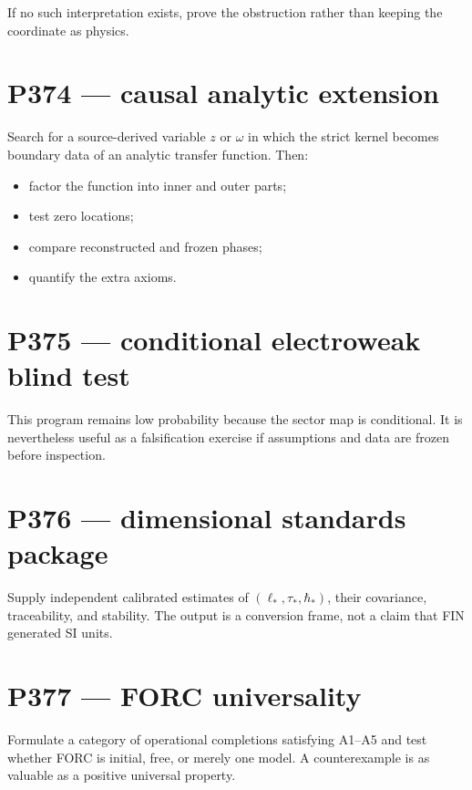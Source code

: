 \documentclass[11pt,a4paper,openany]{report}
\begin{document}
If no such interpretation exists, prove the obstruction rather than keeping the coordinate as physics.

\section{P374 --- causal analytic extension}

Search for a source-derived variable \(z\) or \(\omega\) in which the strict kernel becomes boundary data of an analytic transfer function. Then:

\begin{itemize}
\item 
factor the function into inner and outer parts;

\item 
test zero locations;

\item 
compare reconstructed and frozen phases;

\item 
quantify the extra axioms.

\end{itemize}

\section{P375 --- conditional electroweak blind test}

This program remains low probability because the sector map is conditional. It is nevertheless useful as a falsification exercise if assumptions and data are frozen before inspection.

\section{P376 --- dimensional standards package}

Supply independent calibrated estimates of \((\ell_*,\tau_*,\hbar_*)\), their covariance, traceability, and stability. The output is a conversion frame, not a claim that FIN generated SI units.

\section{P377 --- FORC universality}

Formulate a category of operational completions satisfying A1--A5 and test whether FORC is initial, free, or merely one model. A counterexample is as valuable as a positive universal property.
\end{document}
